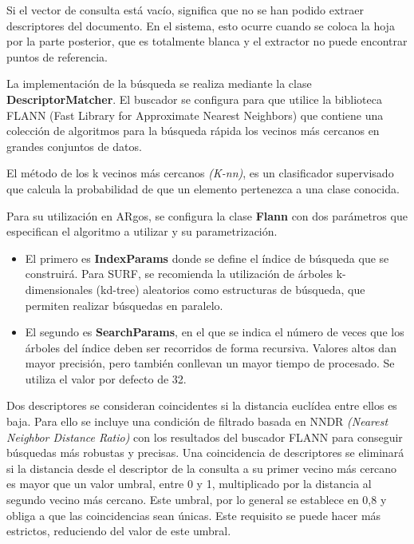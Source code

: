 Si el vector de consulta está vacío, significa que no se han podido
extraer descriptores del documento. En el sistema, esto ocurre
cuando se coloca la hoja por la parte posterior, que es totalmente
blanca y el extractor no puede encontrar puntos de referencia.

La implementación de la búsqueda se realiza mediante la clase
\textbf{DescriptorMatcher}. El buscador se configura para que utilice
la biblioteca FLANN (Fast Library for Approximate Nearest Neighbors)
que contiene una colección de algoritmos para la búsqueda rápida los
vecinos más cercanos en grandes conjuntos de datos.

El método de los k vecinos más cercanos \emph{(K-nn)}, es un clasificador
supervisado que calcula la probabilidad de que un elemento pertenezca
a una clase conocida.

Para su utilización en ARgos, se configura la clase \textbf{Flann}
con dos parámetros que especifican el algoritmo a utilizar y su parametrización.

\begin{itemize}
\item El primero es \textbf{IndexParams} donde se define el índice de búsqueda
que se construirá. Para SURF, se recomienda la utilización de árboles
k-dimensionales (kd-tree) aleatorios como estructuras de búsqueda, que
permiten realizar búsquedas en paralelo.

\item El segundo es \textbf{SearchParams}, en el que se indica el número de
veces que los árboles del índice deben ser recorridos de forma
recursiva. Valores altos dan mayor precisión, pero también conllevan
un mayor tiempo de procesado. Se utiliza el valor por defecto de 32.
\end{itemize}

Dos descriptores se consideran coincidentes si la distancia euclídea
entre ellos es baja. Para ello se incluye una condición de filtrado
basada en NNDR \emph{(Nearest Neighbor Distance Ratio)} con los resultados
del buscador FLANN para conseguir búsquedas más robustas y
precisas. Una coincidencia de descriptores se eliminará si la
distancia desde el descriptor de la consulta a su primer vecino más
cercano es mayor que un valor umbral, entre 0 y 1, multiplicado por la
distancia al segundo vecino más cercano. Este umbral, por lo general
se establece en 0,8 y obliga a que las coincidencias sean únicas. Este
requisito se puede hacer más estrictos, reduciendo del valor de este
umbral.


